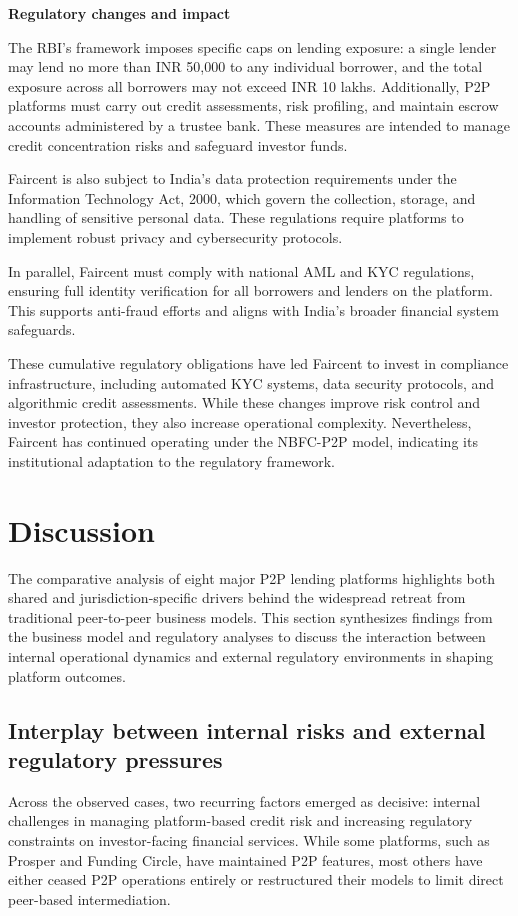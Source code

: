 \documentclass[pdflatex,sn-apa]{sn-jnl}%
\theoremstyle{thmstyleone}%
\theoremstyle{thmstyletwo}%
\theoremstyle{thmstylethree}%
\begin{document}
\textbf{Regulatory changes and impact}

The RBI’s framework imposes specific caps on lending exposure: a single lender may lend no more than INR 50,000 to any individual borrower, and the total exposure across all borrowers may not exceed INR 10 lakhs. Additionally, P2P platforms must carry out credit assessments, risk profiling, and maintain escrow accounts administered by a trustee bank. These measures are intended to manage credit concentration risks and safeguard investor funds.

Faircent is also subject to India's data protection requirements under the Information Technology Act, 2000, which govern the collection, storage, and handling of sensitive personal data. These regulations require platforms to implement robust privacy and cybersecurity protocols.

In parallel, Faircent must comply with national AML and KYC regulations, ensuring full identity verification for all borrowers and lenders on the platform. This supports anti-fraud efforts and aligns with India’s broader financial system safeguards.

These cumulative regulatory obligations have led Faircent to invest in compliance infrastructure, including automated KYC systems, data security protocols, and algorithmic credit assessments. While these changes improve risk control and investor protection, they also increase operational complexity. Nevertheless, Faircent has continued operating under the NBFC-P2P model, indicating its institutional adaptation to the regulatory framework.

\section{Discussion}

The comparative analysis of eight major P2P lending platforms highlights both shared and jurisdiction-specific drivers behind the widespread retreat from traditional peer-to-peer business models. This section synthesizes findings from the business model and regulatory analyses to discuss the interaction between internal operational dynamics and external regulatory environments in shaping platform outcomes. 

\subsection{Interplay between internal risks and external regulatory pressures}
Across the observed cases, two recurring factors emerged as decisive: internal challenges in managing platform-based credit risk and increasing regulatory constraints on investor-facing financial services. While some platforms, such as Prosper and Funding Circle, have maintained P2P features, most others have either ceased P2P operations entirely or restructured their models to limit direct peer-based intermediation. 
\end{document}
